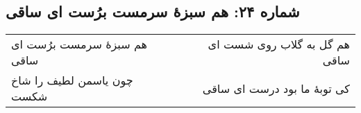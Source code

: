 \begin{center}
\section*{شماره ۲۴: هم سبزۀ سرمست برُست ای ساقی}
\label{sec:024}
\begin{longtable}{l p{0.5cm} r}
هم سبزهٔ سرمست برُست ای ساقی
&&
هم گل به گلاب روی شست ای ساقی
\\
چون یاسمن لطیف را شاخ شکست
&&
کی توبهٔ ما بود درست ای ساقی
\\
\end{longtable}
\end{center}
